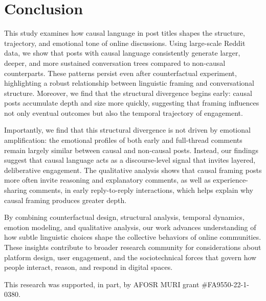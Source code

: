 \documentclass[acmsmall]{acmart}
\begin{document}
\section{Conclusion}

This study examines how causal language in post titles shapes the structure, trajectory, and emotional tone of online discussions. Using large-scale Reddit data, we show that posts with causal language consistently generate larger, deeper, and more sustained conversation trees compared to non-causal counterparts. These patterns persist even after counterfactual experiment, highlighting a robust relationship between linguistic framing and conversational structure. Moreover, we find that the structural divergence begins early: causal posts accumulate depth and size more quickly, suggesting that framing influences not only eventual outcomes but also the temporal trajectory of engagement.

Importantly, we find that this structural divergence is not driven by emotional amplification: the emotional profiles of both early and full-thread comments remain largely similar between causal and non-causal posts. Instead, our findings suggest that causal language acts as a discourse-level signal that invites layered, deliberative engagement. The qualitative analysis shows that causal framing posts more often invite reasoning and explanatory comments, as well as experience-sharing comments, in early reply-to-reply interactions, which helps explain why causal framing produces greater depth.

By combining counterfactual design, structural analysis, temporal dynamics, emotion modeling, and qualitative analysis, our work advances understanding of how subtle linguistic choices shape the collective behaviors of online communities. These insights contribute to broader research community for considerations about platform design, user engagement, and the sociotechnical forces that govern how people interact, reason, and respond in digital spaces.















\begin{acks}
This research was supported, in part, by AFOSR MURI grant \#FA9550-22-1-0380. 
\end{acks}
\end{document}
